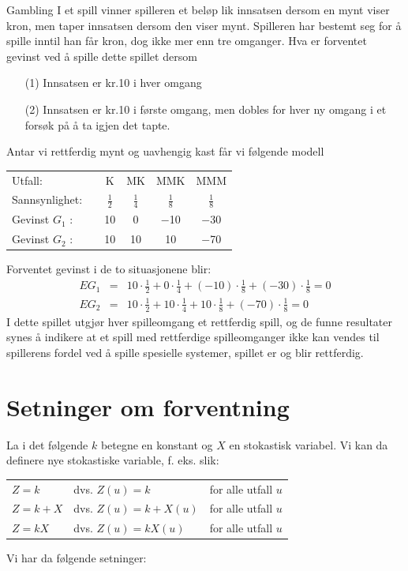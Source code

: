 \begin{eksempel}{Gambling}
I et spill vinner spilleren et beløp lik innsatsen dersom en mynt
viser kron, men taper innsatsen dersom den viser mynt. Spilleren
har bestemt seg for å spille inntil han får kron, dog ikke mer
enn tre omganger. Hva er forventet gevinst ved å spille dette
spillet dersom
\begin{itemize} 
\item[(1)]  Innsatsen er kr.10 i hver omgang
\item[(2)]  Innsatsen er kr.10 i første omgang, men dobles for hver ny
             omgang i et forsøk på å ta igjen det tapte.
\end{itemize}
Antar vi rettferdig mynt og uavhengig kast får vi følgende modell

 \begin{center}
 \begin{tabular}{lccccc}
Utfall:        &  &   K &    MK  &  MMK  &  MMM \\
Sannsynlighet: &  &$\frac{1}{2}$&$\frac{1}{4}$&$\frac{1}{8}$&$\frac{1}{8}$ \\
Gevinst $G_1$ :&  &  10 & 0&$-$10&$-$30 \\
Gevinst $G_2$ :&  &  10 &10& 10&$-$70
 \end{tabular}
\end{center}

\noindent Forventet gevinst i de to situasjonene blir:
\begin{eqnarray*}
   EG_1&=&10 \cdot \frac{1}{2}+0 \cdot \frac{1}{4}+
                     (-10) \cdot \frac{1}{8}+(-30) \cdot \frac{1}{8}=0 \\
   EG_2&=&10 \cdot \frac{1}{2}+10 \cdot \frac{1}{4}+
                     10 \cdot \frac{1}{8}+(-70) \cdot \frac{1}{8}=0
\end{eqnarray*}
\noindent I dette spillet utgjør hver spilleomgang et rettferdig spill, og
de funne resultater synes å indikere at et spill med rettferdige
spilleomganger ikke kan vendes til spillerens fordel ved å spille
spesielle systemer, spillet er og blir rettferdig.
\end{eksempel}


\section{Setninger om forventning}

La i det følgende $k$ betegne en konstant og $X$ en stokastisk
variabel. Vi kan da definere nye stokastiske variable, f. eks.
slik:
\begin{center}
 \begin{tabular}{lll}
     $Z=k$   &   dvs. $Z(u)=k$      &  for alle utfall $u$ \\
     $Z=k+X$ &   dvs. $Z(u)=k+X(u)$ &  for alle utfall $u$ \\
     $Z=kX$  &   dvs. $Z(u)=kX(u)$  &  for alle utfall $u$
 \end{tabular}
\end{center}
\noindent Vi har da følgende setninger:

